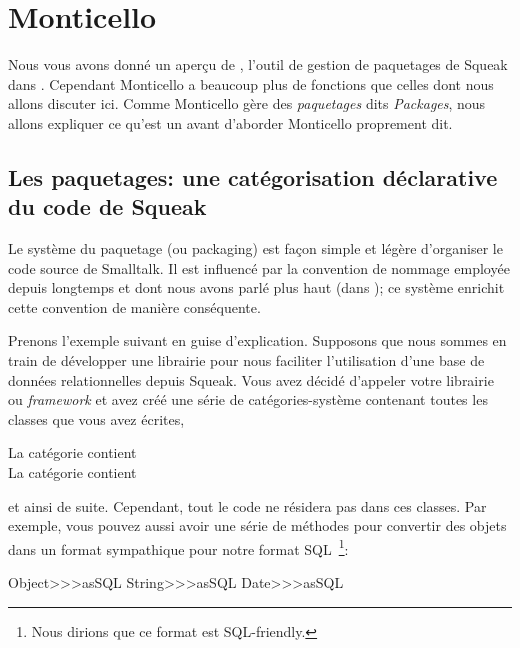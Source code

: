 \documentclass[a4paper,10pt,twoside]{book}
\begin{document}
\section{Monticello}

Nous vous avons donn\'e un aper\c{c}u de , l'outil de gestion
de paquetages de Squeak dans .  
Cependant Monticello a beaucoup plus de fonctions que celles dont nous allons
discuter ici.
Comme Monticello g\`ere des \emph{paquetages} dits \emph{Packages}, nous allons expliquer ce qu'est
un  avant d'aborder Monticello proprement dit.

\subsection{Les paquetages: une cat\'egorisation d\'eclarative du code de Squeak}

Le syst\`eme du paquetage (ou packaging) est fa\c{c}on simple et l\'eg\`ere
d'organiser le code source de Smalltalk.
Il est influenc\'e par la convention de nommage employ\'ee depuis longtemps et dont nous avons parl\'e plus haut (dans ); ce syst\`eme enrichit cette convention de mani\`ere cons\'equente.

Prenons l'exemple suivant en guise d'explication.
Supposons que nous sommes en train de d\'evelopper une librairie pour
nous faciliter l'utilisation d'une base de donn\'ees relationnelles depuis
Squeak. Vous avez d\'ecid\'e d'appeler votre librairie ou \emph{framework}
 et avez cr\'e\'e une s\'erie de cat\'egories-syst\`eme
contenant toutes les classes que vous avez \'ecrites, \eg

\vspace{1ex}
\noindent
La cat\'egorie  contient \\
La cat\'egorie  contient 

\vspace{1ex}
\noindent
et ainsi de suite. Cependant, tout le code ne r\'esidera pas dans ces classes.
Par exemple, vous pouvez aussi avoir une s\'erie de m\'ethodes pour 
convertir des objets dans un format sympathique pour notre format SQL~\footnote{Nous dirions que ce format est SQL-friendly.}:

\begin{code}{}
Object>>>asSQL
String>>>asSQL
Date>>>asSQL
\end{code}
\end{document}
